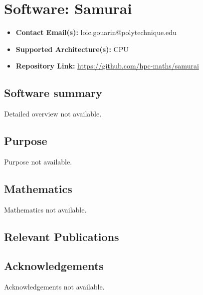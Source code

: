 \section{Software: Samurai}
\label{sec:Samurai:software}



\begin{itemize}
    \item \textbf{Contact Email(s):} loic.gouarin@polytechnique.edu
    \item \textbf{Supported Architecture(s):} CPU
    \item \textbf{Repository Link:} \href{https://github.com/hpc-maths/samurai}{https://github.com/hpc-maths/samurai}
\end{itemize}

\subsection{Software summary}
\label{sec:Samurai:summary}
Detailed overview not available.



\subsection{Purpose}
\label{sec:Samurai:purpose}
Purpose not available.



\subsection{Mathematics}
\label{sec:Samurai:mathematics}
Mathematics not available.


\subsection{Relevant Publications}
\label{sec:Samurai:publications}

\subsection{Acknowledgements}
\label{sec::Samurai:acknowledgements}

Acknowledgements not available.


